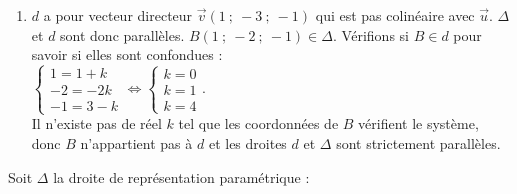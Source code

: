 \documentclass{cornouaille}
\begin{document}
\begin{colonne*exercice}
\begin{corrige}
\begin{enumerate}
  \hspace*{-5mm}$\begin{cases}
    x=1-t\\y=-2+3t\\z=-1+t\\x=1+k\\y=-2k\\z=3-k \end{cases}\hspace{-4mm}\Leftrightarrow \begin{cases}
    1+k=1-t\\-2k=-2+3t\\3-k=-1+t\\x=1+k\\y=-2k\\z=3-k \end{cases}\hspace{-4mm}\Leftrightarrow
  \begin{cases} k=-t\\t=2\\3=-1
    !!!\\x=1+k\\y=-2k\\z=3-k \end{cases}$\\
  Le système n'admet pas de solution et les droites $d$ et $\Delta$
  sont donc non coplanaires.
\item $d$ a pour vecteur directeur
  $\overrightarrow{v}(1\ ;\ -3\ ;\ -1)$ qui est pas colinéaire avec
  $\overrightarrow{u}$. $\Delta$ et $d$ sont donc parallèles.
  $B(1\ ;\ -2\ ;\ -1)\in\Delta$. Vérifions si $B\in d$ pour savoir si elles sont confondues :\\
  $\begin{cases} 1=1+k\\-2=-2k\\-1=3-k \end{cases}\Leftrightarrow \begin{cases} k=0\\k=1\\k=4 \end{cases}$.\\
  Il n'existe pas de réel $k$ tel que les coordonnées de $B$ vérifient
  le système, donc $B$ n'appartient pas à $d$ et les droites $d$ et
  $\Delta$ sont strictement parallèles.
 \end{enumerate}
\end{corrige}


\begin{exercice}
  Soit $\Delta$ la droite de représentation paramétrique :


\end{exercice}
\end{colonne*exercice}
\end{document}
